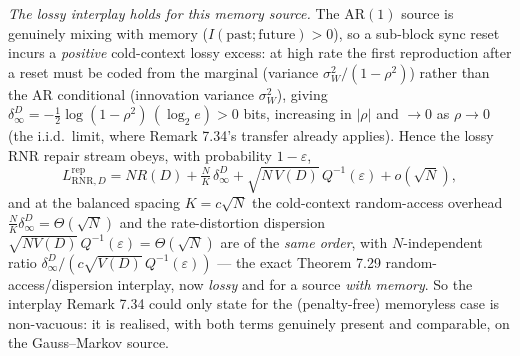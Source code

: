 \documentclass[
]{article}
\begin{document}
\emph{The lossy interplay holds for this memory source.} The AR$(1)$ source is genuinely
mixing with memory ($I(\text{past};\text{future})>0$), so a sub-block sync reset incurs a
\emph{positive} cold-context lossy excess: at high rate the first reproduction after a reset
must be coded from the marginal (variance $\sigma_W^2/(1-\rho^2)$) rather than the AR
conditional (innovation variance $\sigma_W^2$), giving
$\delta_\infty^D=-\tfrac12\log(1-\rho^2)\,(\log_2 e)>0$ bits, increasing in $|\rho|$ and
$\to0$ as $\rho\to0$ (the i.i.d.\ limit, where Remark 7.34's transfer already applies). Hence
the lossy RNR repair stream obeys, with probability $1-\varepsilon$,
\[
  L^{\mathrm{rep}}_{\mathrm{RNR},D}=N R(D)+\tfrac NK\,\delta_\infty^D
  +\sqrt{N\,V(D)}\,Q^{-1}(\varepsilon)+o(\sqrt N),
\]
and at the balanced spacing $K=c\sqrt N$ the cold-context random-access overhead
$\tfrac NK\delta_\infty^D=\Theta(\sqrt N)$ and the rate-distortion dispersion
$\sqrt{NV(D)}\,Q^{-1}(\varepsilon)=\Theta(\sqrt N)$ are of the \emph{same order}, with
$N$-independent ratio $\delta_\infty^D/(c\sqrt{V(D)}\,Q^{-1}(\varepsilon))$ --- the exact
Theorem 7.29 random-access/dispersion interplay, now \emph{lossy} and for a source \emph{with
memory}. So the interplay Remark 7.34 could only state for the (penalty-free) memoryless case
is non-vacuous: it is realised, with both terms genuinely present and comparable, on the
Gauss--Markov source.
\end{document}
